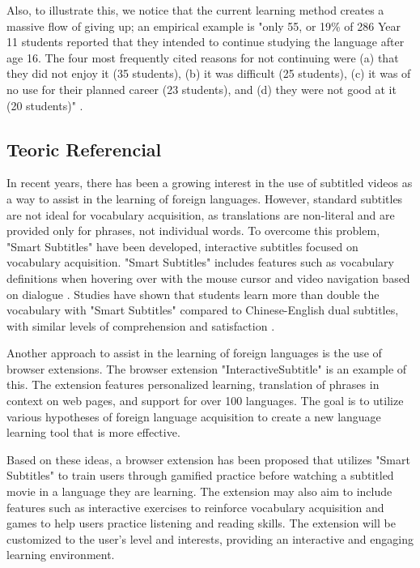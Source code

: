 \documentclass[12pt]{article}
\begin{document}
Also, to illustrate this, we notice that the current learning method creates a massive flow of giving up; an empirical example is "only 55, or 19\% of 286 Year 11 students reported that they intended to continue studying the language after age 16. The four most frequently cited reasons for not continuing were (a) that they did not enjoy it (35 students), (b) it was difficult (25 students), (c) it was of no use for their planned career (23 students), and (d) they were not good at it (20 students)" \cite{Graham1}.


\subsection{Teoric Referencial}
In recent years, there has been a growing interest in the use of subtitled videos as a way to assist in the learning of foreign languages. However, standard subtitles are not ideal for vocabulary acquisition, as translations are non-literal and are provided only for phrases, not individual words. To overcome this problem, "Smart Subtitles" have been developed, interactive subtitles focused on vocabulary acquisition. "Smart Subtitles" includes features such as vocabulary definitions when hovering over with the mouse cursor and video navigation based on dialogue \cite{Kovacs13}. Studies have shown that students learn more than double the vocabulary with "Smart Subtitles" compared to Chinese-English dual subtitles, with similar levels of comprehension and satisfaction \cite{Kovacs14}.


Another approach to assist in the learning of foreign languages is the use of browser extensions. The browser extension "InteractiveSubtitle" \cite{ElBatanony21} is an example of this. The extension features personalized learning, translation of phrases in context on web pages, and support for over 100 languages. The goal is to utilize various hypotheses of foreign language acquisition to create a new language learning tool that is more effective.


Based on these ideas, a browser extension has been proposed that utilizes "Smart Subtitles" to train users through gamified practice before watching a subtitled movie in a language they are learning. The extension may also aim to include features such as interactive exercises to reinforce vocabulary acquisition and games to help users practice listening and reading skills. The extension will be customized to the user's level and interests, providing an interactive and engaging learning environment.
\end{document}
